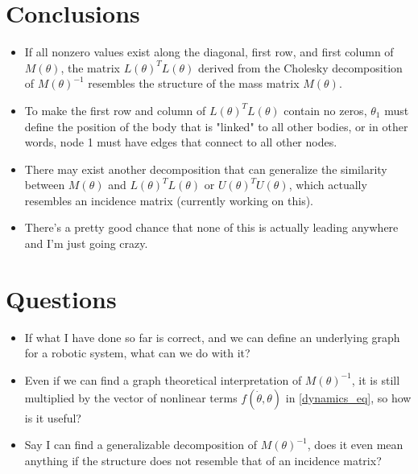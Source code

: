 \documentclass[conference]{IEEEtran}
\begin{document}
\section{Conclusions}
\begin{itemize}
    \item If all nonzero values exist along the diagonal, first row, and first column of $M(\theta)$, the matrix $L(\theta)^TL(\theta)$ derived from the Cholesky decomposition of $M(\theta)^{-1}$ resembles the structure of the mass matrix $M(\theta)$.
    \item To make the first row and column of $L(\theta)^TL(\theta)$ contain no zeros, $\theta_1$ must define the position of the body that is "linked" to all other bodies, or in other words, node 1 must have edges that connect to all other nodes.
    \item There may exist another decomposition that can generalize the similarity between $M(\theta)$ and $L(\theta)^TL(\theta)$ or $U(\theta)^TU(\theta)$, which actually resembles an incidence matrix (currently working on this).
    \item There's a pretty good chance that none of this is actually leading anywhere and I'm just going crazy.
\end{itemize}

\section{Questions}
\begin{itemize}
    \item If what I have done so far is correct, and we can define an underlying graph for a robotic system, what can we do with it?
    \item Even if we can find a graph theoretical interpretation of $M(\theta)^{-1}$, it is still multiplied by the vector of nonlinear terms $f(\dot{\theta},\theta)$ in \eqref{dynamics_eq}, so how is it useful?
    \item Say I can find a generalizable decomposition of $M(\theta)^{-1}$, does it even mean anything if the structure does not resemble that of an incidence matrix?
\end{itemize}
\end{document}
